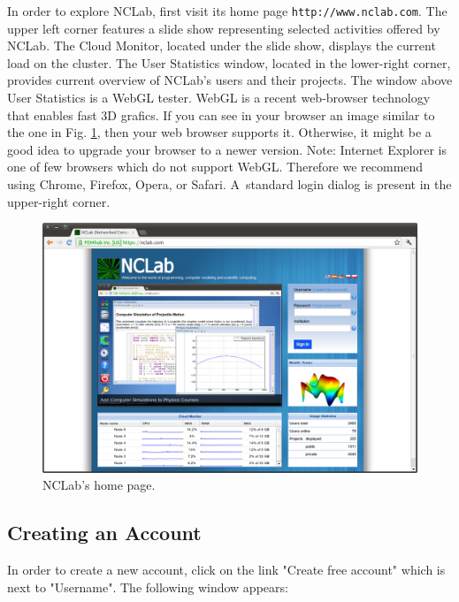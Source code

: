 \documentclass[article,A4,12pt]{llncs}
\begin{document}
In order to explore NCLab, first visit its home page {\tt http://www.nclab.com}.
The upper left corner features a slide show representing selected activities 
offered by NCLab. The Cloud Monitor, located under the slide show, displays 
the current load on the cluster. The User Statistics window, located in the 
lower-right corner, provides current overview of NCLab's users and their projects. 
The window above User Statistics is a WebGL tester. WebGL is a recent web-browser technology 
that enables fast 3D grafics. If you can see in your browser an image similar to 
the one in Fig. \ref{fig:outside}, then your web browser supports it. Otherwise, 
it might be a good idea to upgrade your browser to a newer version. Note:
Internet Explorer is one of few browsers which do not support WebGL. Therefore 
we recommend using Chrome, Firefox, Opera, or Safari. A~standard login dialog 
is present in the upper-right corner.

\begin{figure}[!ht]
\begin{center}
\includegraphics[width=\textwidth]{img/outside.png}
\end{center}
\caption{NCLab's home page.}
\label{fig:outside}
\end{figure}

\newpage

\subsection{Creating an Account}

In order to create a new account, click on the link "Create free account" which is next to
"Username". The following window appears:
\end{document}
